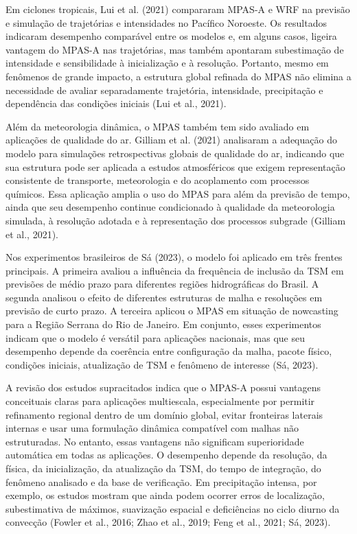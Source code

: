 \documentclass[12pt,a4paper,oneside]{book}
\begin{document}
Em ciclones tropicais, Lui et al. (2021) compararam MPAS-A e WRF na previsão e simulação de trajetórias e intensidades no Pacífico Noroeste. Os resultados indicaram desempenho comparável entre os modelos e, em alguns casos, ligeira vantagem do MPAS-A nas trajetórias, mas também apontaram subestimação de intensidade e sensibilidade à inicialização e à resolução. Portanto, mesmo em fenômenos de grande impacto, a estrutura global refinada do MPAS não elimina a necessidade de avaliar separadamente trajetória, intensidade, precipitação e dependência das condições iniciais (Lui et al., 2021).

Além da meteorologia dinâmica, o MPAS também tem sido avaliado em aplicações de qualidade do ar. Gilliam et al. (2021) analisaram a adequação do modelo para simulações retrospectivas globais de qualidade do ar, indicando que sua estrutura pode ser aplicada a estudos atmosféricos que exigem representação consistente de transporte, meteorologia e do acoplamento com processos químicos. Essa aplicação amplia o uso do MPAS para além da previsão de tempo, ainda que seu desempenho continue condicionado à qualidade da meteorologia simulada, à resolução adotada e à representação dos processos subgrade (Gilliam et al., 2021).

Nos experimentos brasileiros de Sá (2023), o modelo foi aplicado em três frentes principais. A primeira avaliou a influência da frequência de inclusão da TSM em previsões de médio prazo para diferentes regiões hidrográficas do Brasil. A segunda analisou o efeito de diferentes estruturas de malha e resoluções em previsão de curto prazo. A terceira aplicou o MPAS em situação de nowcasting para a Região Serrana do Rio de Janeiro. Em conjunto, esses experimentos indicam que o modelo é versátil para aplicações nacionais, mas que seu desempenho depende da coerência entre configuração da malha, pacote físico, condições iniciais, atualização de TSM e fenômeno de interesse (Sá, 2023).

A revisão dos estudos supracitados indica que o MPAS-A possui vantagens conceituais claras para aplicações multiescala, especialmente por permitir refinamento regional dentro de um domínio global, evitar fronteiras laterais internas e usar uma formulação dinâmica compatível com malhas não estruturadas. No entanto, essas vantagens não significam superioridade automática em todas as aplicações. O desempenho depende da resolução, da física, da inicialização, da atualização da TSM, do tempo de integração, do fenômeno analisado e da base de verificação. Em precipitação intensa, por exemplo, os estudos mostram que ainda podem ocorrer erros de localização, subestimativa de máximos, suavização espacial e deficiências no ciclo diurno da convecção (Fowler et al., 2016; Zhao et al., 2019; Feng et al., 2021; Sá, 2023).
\end{document}
